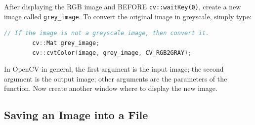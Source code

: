 \documentclass[english,a4paper,12pt,oneside]{article}
\begin{document}
After displaying the RGB image and BEFORE \verb+cv::waitKey(0)+, create a new image called \verb+grey_image+. 
To convert the original image in greyscale, simply type:
\begin{lstlisting}[language=c++,caption=Convert the color model of the image.]
        // If the image is not a greyscale image, then convert it.
        cv::Mat grey_image;
        cv::cvtColor(image, grey_image, CV_RGB2GRAY);
\end{lstlisting}

In OpenCV in general, the first argument is the input image; the second argument is the output image; other arguments are the parameters of the function. 
Now create another window where to display the new image. 

\subsection{Saving an Image into a File}
\end{document}
